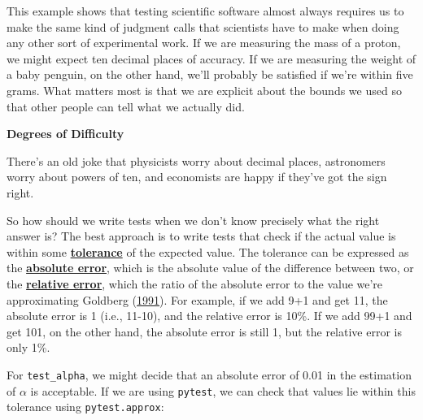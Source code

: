 \documentclass[
]{krantz}
\renewenvironment{quote}{\begin{VF}}{\end{VF}}
\newcommand{\gref}[2]{\hyperlink{#2}{\textbf{#1}}}
\begin{document}
This example shows that testing scientific software
almost always requires us to make the same kind of judgment calls
that scientists have to make when doing any other sort of experimental work.
If we are measuring the mass of a proton,
we might expect ten decimal places of accuracy.
If we are measuring the weight of a baby penguin,
on the other hand,
we'll probably be satisfied if we're within five grams.
What matters most is that we are explicit about the bounds we used
so that other people can tell what we actually did.

\begin{quote}
\textbf{Degrees of Difficulty}

There's an old joke that physicists worry about decimal places,
astronomers worry about powers of ten,
and economists are happy if they've got the sign right.
\end{quote}

So how should we write tests when we don't know precisely what the right answer is?
The best approach is to write tests that check
if the actual value is within some \gref{tolerance}{tolerance} of the expected value.
The tolerance can be expressed as the \gref{absolute error}{absolute\_error},
which is the absolute value of the difference between two,
or the \gref{relative error}{relative\_error},
which the ratio of the absolute error to the value we're approximating Goldberg (\protect\hyperlink{ref-Gold1991}{1991}).
For example,
if we add 9+1 and get 11,
the absolute error is 1 (i.e., 11-10),
and the relative error is 10\%.
If we add 99+1 and get 101,
on the other hand,
the absolute error is still 1,
but the relative error is only 1\%.

For \texttt{test\_alpha},
we might decide that an absolute error of 0.01 in the estimation of \(\alpha\) is acceptable.
If we are using \texttt{pytest},
we can check that values lie within this tolerance using \texttt{pytest.approx}:
\end{document}
